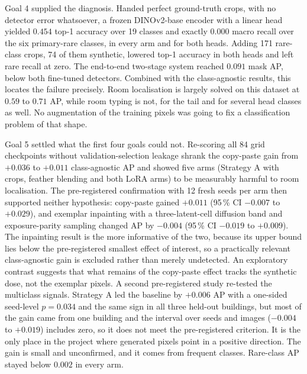 Goal 4 supplied the diagnosis. Handed perfect ground-truth crops, with no
detector error whatsoever, a frozen DINOv2-base encoder with a linear head
yielded $0.454$ top-1 accuracy over 19 classes and exactly $0.000$ macro recall
over the six primary-rare classes, in every arm and for both heads. Adding 171 rare-class crops, 74 of them synthetic, lowered top-1 accuracy in both heads and left rare recall at zero. The end-to-end two-stage system reached $0.091$ mask AP, below
both fine-tuned detectors. Combined with the class-agnostic results, this
locates the failure precisely. Room localisation is largely solved on this
dataset at $0.59$ to $0.71$ AP, while room typing is not, for the tail and for
several head classes as well. No augmentation of the training pixels was going to fix a classification problem of that shape.

Goal 5 settled what the first four goals could not. Re-scoring all 84 grid
checkpoints without validation-selection leakage shrank the copy-paste gain
from $+0.036$ to $+0.011$ class-agnostic AP and showed five arms (Strategy A
with crops, feather blending and both LoRA arms) to be measurably harmful to
room localisation. The pre-registered confirmation with 12 fresh seeds per arm
then supported neither hypothesis: copy-paste gained $+0.011$ (95\,\% CI
$-0.007$ to $+0.029$), and exemplar inpainting with a three-latent-cell
diffusion band and exposure-parity sampling changed AP by $-0.004$ (95\,\% CI
$-0.019$ to $+0.009$). The inpainting result is the more informative of the
two, because its upper bound lies below the pre-registered smallest effect of
interest, so a practically relevant class-agnostic gain is excluded rather than
merely undetected. An exploratory contrast suggests that what remains of the
copy-paste effect tracks the synthetic dose, not the exemplar pixels.
A second pre-registered study re-tested the multiclass signals. Strategy A
led the baseline by $+0.006$ AP with a one-sided seed-level $p = 0.034$ and
the same sign in all three held-out buildings, but most of the gain came from
one building and the interval over seeds and images ($-0.004$ to $+0.019$)
includes zero, so it does not meet the pre-registered criterion. It is the
only place in the project where generated pixels point in a positive direction.
The gain is small and unconfirmed, and it comes from frequent classes.
Rare-class AP stayed below $0.002$ in every arm.

